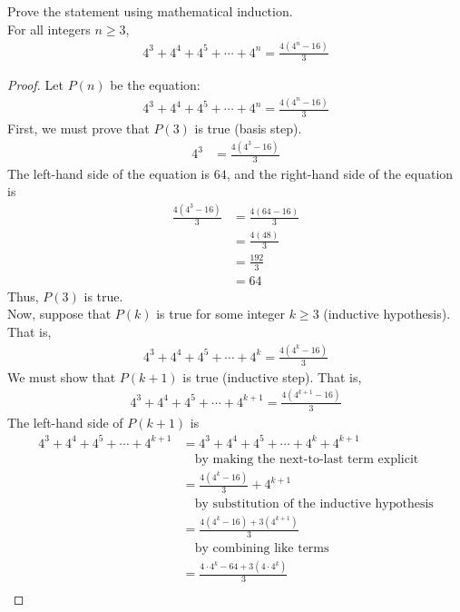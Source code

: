 \documentclass[name=Ojas\ Chaturvedi, emailid=oj.chaturvedi.2024, course=Capstone:\ Discrete\ Math, num=8, deadline={November\ 2,\ 2023}]{homework}
\begin{document}
Prove the statement using mathematical induction. \\
For all integers $n \geq 3$,
\begin{align*}
    4^3 + 4^4 + 4^5 + \cdots + 4^n = \frac{4(4^n-16)}{3}
\end{align*}
\begin{proof}
    Let $P(n)$ be the equation:
    \begin{align*}
        4^3 + 4^4 + 4^5 + \cdots + 4^n = \frac{4(4^n-16)}{3}
    \end{align*}
    First, we must prove that $P(3)$ is true (basis step).
    \begin{align*}
        4^3 &= \frac{4(4^3-16)}{3}
    \end{align*}
    The left-hand side of the equation is $64$, and the right-hand side of the equation is
    \begin{align*}
        \frac{4(4^3-16)}{3} &= \frac{4(64-16)}{3} \\
        &= \frac{4(48)}{3} \\
        &= \frac{192}{3} \\
        &= 64
    \end{align*}
    Thus, $P(3)$ is true. \\
    Now, suppose that $P(k)$ is true for some integer $k \geq 3$ (inductive hypothesis). That is,
    \begin{align*}
        4^3 + 4^4 + 4^5 + \cdots + 4^k = \frac{4(4^k-16)}{3}
    \end{align*}
    We must show that $P(k+1)$ is true (inductive step). That is,
    \begin{align*}
        4^3 + 4^4 + 4^5 + \cdots + 4^{k+1} = \frac{4(4^{k+1}-16)}{3}
    \end{align*}
    The left-hand side of $P(k+1)$ is
    \begin{align*}
        4^3 + 4^4 + 4^5 + \cdots + 4^{k+1} &= 4^3 + 4^4 + 4^5 + \cdots + 4^k + 4^{k+1} \\
        & \quad \text{by making the next-to-last term explicit} \\
        &= \frac{4(4^k-16)}{3} + 4^{k+1} \\
        & \quad \text{by substitution of the inductive hypothesis} \\
        &= \frac{4(4^k-16) + 3(4^{k+1})}{3} \\
        & \quad \text{by combining like terms} \\
        &= \frac{4 \cdot 4^k - 64 + 3(4 \cdot 4^k)}{3} \\

\end{align*}
\end{proof}
\end{document}
